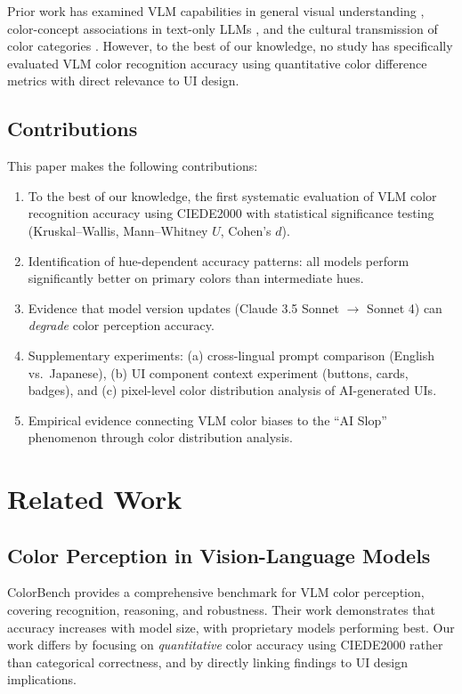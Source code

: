 \documentclass[11pt,a4paper]{article}
\begin{document}
Prior work has examined VLM capabilities in general visual understanding \cite{colorbench2025}, color-concept associations in text-only LLMs \cite{springer2025}, and the cultural transmission of color categories \cite{arxiv2509}. However, to the best of our knowledge, no study has specifically evaluated VLM color recognition accuracy using quantitative color difference metrics with direct relevance to UI design.

\subsection{Contributions}

This paper makes the following contributions:
\begin{enumerate}
    \item To the best of our knowledge, the first systematic evaluation of VLM color recognition accuracy using CIEDE2000 with statistical significance testing (Kruskal--Wallis, Mann--Whitney $U$, Cohen's $d$).
    \item Identification of hue-dependent accuracy patterns: all models perform significantly better on primary colors than intermediate hues.
    \item Evidence that model version updates (Claude 3.5 Sonnet $\rightarrow$ Sonnet 4) can \textit{degrade} color perception accuracy.
    \item Supplementary experiments: (a) cross-lingual prompt comparison (English vs.\ Japanese), (b) UI component context experiment (buttons, cards, badges), and (c) pixel-level color distribution analysis of AI-generated UIs.
    \item Empirical evidence connecting VLM color biases to the ``AI Slop'' phenomenon through color distribution analysis.
\end{enumerate}

\section{Related Work}

\subsection{Color Perception in Vision-Language Models}

ColorBench \cite{colorbench2025} provides a comprehensive benchmark for VLM color perception, covering recognition, reasoning, and robustness. Their work demonstrates that accuracy increases with model size, with proprietary models performing best. Our work differs by focusing on \textit{quantitative} color accuracy using CIEDE2000 rather than categorical correctness, and by directly linking findings to UI design implications.
\end{document}
